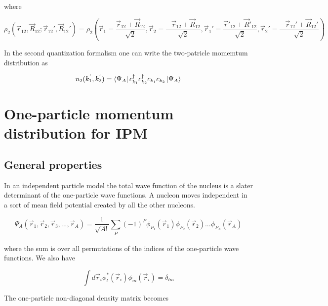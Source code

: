\documentclass[12pt]{article}
\begin{document}
where 

\begin{equation}
\rho_2(\vec{r}_{12},\vec{R}_{12}; \vec{r}_{12}',\vec{R}_{12}') = 
							\rho_2\left(	
							\vec{r}_1=\frac{\vec{r}_{12} + \vec{R}_{12}}{\sqrt{2}},
							\vec{r}_2=\frac{-\vec{r}_{12} + \vec{R}_{12}}{\sqrt{2}},
						    \vec{r}_1'=\frac{\vec{r}'_{12} + \vec{R}'_{12}}{\sqrt{2}},	
						    \vec{r}_2'=\frac{-\vec{r}_{12}' + \vec{R}_{12}'}{\sqrt{2}}
						    \right)
\end{equation}

In the second quantization formalism one can write the two-patricle momemtum distribution as

\begin{equation}
n_2(\vec{k_1},\vec{k_2})= \bra{\Psi_A} c^\dagger_{k_1} c^\dagger_{k_2} c_{k_1} c_{k_2} \ket{\Psi_A}
\end{equation}

 





\section{One-particle momentum distribution for IPM}
\subsection{General properties}

In an independent particle model the total wave function of the nucleus is a slater determinant of the one-particle wave functions. A nucleon moves independent in a sort of mean field potential created by all the other nucleons. 

\begin{equation}
\Psi_A(\vec{r}_1,\vec{r}_2,\vec{r}_3, ... ,\vec{r}_A)= \frac{1}{\sqrt{A!}} \sum_{\substack{P}} 
													  (-1)^P \phi_{P_1}(\vec{r}_1)
													         \phi_{P_2}(\vec{r}_2)...
													         \phi_{P_A}(\vec{r}_A)
\end{equation}

where the sum is over all permutations of the indices of the one-particle wave functions. We also have 

\begin{equation}
\int d\vec{r}_i \phi^*_l(\vec{r}_i)\phi_m(\vec{r}_i) = \delta_{lm}
\end{equation}

The one-particle non-diagonal density matrix becomes
\end{document}
